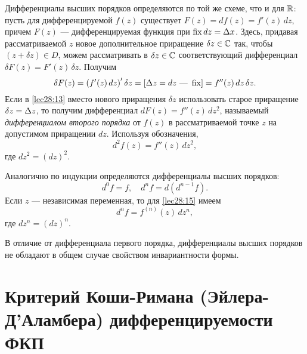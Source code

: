 \documentclass[../../main.tex]{subfiles}
\begin{document}
Дифференциалы высших порядков определяются по той же схеме, что и для $\mathbb{R}$:
пусть для дифференцируемой $f(z)$ существует $F(z) = d f(z) = f'(z)\, dz$, 
причем $F(z)$ --- дифференцируемая функция при $\operatorname{fix} dz = \Delta x$.
Здесь, придавая рассматриваемой
$z$ новое дополнительное приращение $\delta z \in \mathbb{C}$ так, чтобы
$\left(z + \delta z\right) \in D$, можем рассматривать в $\delta z \in \mathbb{C}$
соответствующий дифференциал $\delta F(z) = F'(z)\, \delta z$.
Получим
\begin{equation}
\label{lec28:13}
\delta F(z) = \left(f'(z)\, dz\right)' \delta z =
\left[\Delta z = dz \text{ --- } \operatorname{fix}\right] = f''(z)\, dz\, \delta z.
\end{equation}
Если в \eqref{lec28:13} вместо нового приращения $\delta z$ использовать
старое приращение $\delta z = \Delta z$, то получим дифференциал
$d F(z) = f''(z)\, dz^2$, называемый \emph{дифференциалом второго порядка}
от $f(z)$ в рассматриваемой точке $z$ на допустимом приращении $dz$.
Используя обозначения,
\begin{equation}
\label{lec28:14}
d^2 f(z) = f''(z)\, dz^2,
\end{equation}
где $dz^2 = (dz)^2$.

Аналогично по индукции определяются дифференциалы высших порядков:
\begin{equation}
\label{lec28:15}
d^0 f = f, \quad
d^n f = d \left(d^{n - 1} f \right).
\end{equation}
Если $z$ --- независимая переменная, то для \eqref{lec28:15} имеем
\begin{equation}
\label{lec28:16}
d^n f = f^{(n)} (z)\, dz^n,
\end{equation}
где $dz^n = (dz)^n$.

В отличие от дифференциала первого порядка,
дифференциалы высших порядков не обладают в общем случае свойством
инвариантности формы.

\section{Критерий Коши-Римана (Эйлера-Д'Аламбера) дифференцируемости ФКП}
\end{document}
